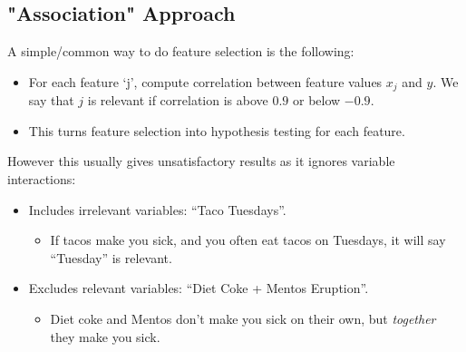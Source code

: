 \documentclass{article}
\def\red#1{{\color{red}#1}}
\begin{document}
\subsection*{"Association" Approach}
A simple/common way to do feature selection is the following:
\begin{itemize}
	\item For each feature ‘j’, compute correlation between feature values $ x_j $ and $ y $. We say that $ j $ is relevant if correlation is above $ 0.9 $ or below $ -0.9 $.
	\item This turns feature selection into hypothesis testing for each feature.
\end{itemize}
However this usually gives unsatisfactory results as it \red{ignores variable interactions}: 
\begin{itemize}
	\item \red{Includes irrelevant variables}: “Taco Tuesdays”.
\begin{itemize}
	\item If tacos make you sick, and you often eat tacos on Tuesdays, it will say “Tuesday” is relevant. 
\end{itemize}
\item \red{Excludes relevant variables}: “Diet Coke + Mentos Eruption”.
\begin{itemize}
	\item Diet coke and Mentos don’t make you sick on their own, but \textit{together} they make you sick.
\end{itemize}
\end{itemize}
\end{document}
